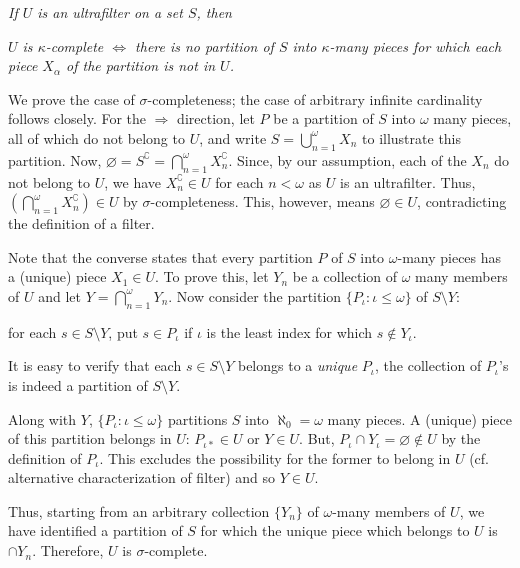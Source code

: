 \documentclass[12pt]{article}
\begin{document}
\emph{If $U$ is an ultrafilter on a set $S$, then}

\begin{center}
\emph{$U$ is $\kappa$-complete $\Leftrightarrow$ there is no partition of $S$ into $\kappa$-many pieces for which each piece $X_\alpha$ of the partition is not in $U$.}
\end{center}

We prove the case of $\sigma$-completeness; the case of arbitrary infinite cardinality follows closely. For the $\Rightarrow$ direction, let $P$ be a partition of $S$ into $\omega$ many pieces, all of which do not belong to $U$, and write $S=\bigcup_{n=1}^\omega X_n$ to illustrate this partition. Now, $\varnothing=S^\complement=\bigcap_{n=1}^\omega X_n^\complement$. Since, by our assumption, each of the $X_n$ do not belong to $U$, we have $X_n^\complement\in U$ for each $n<\omega$ as $U$ is an ultrafilter. Thus, $\left(\bigcap_{n=1}^\omega X_n^\complement\right)\in U$ by $\sigma$-completeness. This, however, means $\varnothing\in U$, contradicting the definition of a filter.

Note that the converse states that every partition $P$ of $S$ into $\omega$-many pieces has a (unique) piece $X_1\in U$. To prove this, let $Y_n$ be a collection of $\omega$ many members of $U$ and let $Y=\bigcap_{n=1}^\omega Y_n$. Now consider the partition $\{P_\iota:\iota\leq\omega\}$ of $S\setminus Y$:

\begin{center}for each $s\in S\setminus Y$, put $s\in P_\iota$ if $\iota$ is the least index for which $s\not\in Y_\iota$.\end{center}

It is easy to verify that each $s\in S\setminus Y$ belongs to a \emph{unique} $P_\iota$, the collection of $P_\iota$'s is indeed a partition of $S\setminus Y$.

Along with $Y$, $\{P_\iota:\iota\leq\omega\}$ partitions $S$ into $\aleph_0=\omega$ many pieces. A (unique) piece of this partition belongs in $U$: $P_{\iota*}\in U$ or $Y\in U$. But, $P_\iota\cap Y_\iota=\varnothing\not\in U$ by the definition of $P_\iota$. This excludes the possibility for the former to belong in $U$ (cf. alternative characterization of filter) and so $Y\in U$.

Thus, starting from an arbitrary collection $\{Y_n\}$ of $\omega$-many members of $U$, we have identified a partition of $S$ for which the unique piece which belongs to $U$ is $\cap Y_n$. Therefore, $U$ is $\sigma$-complete.

\end{document}
